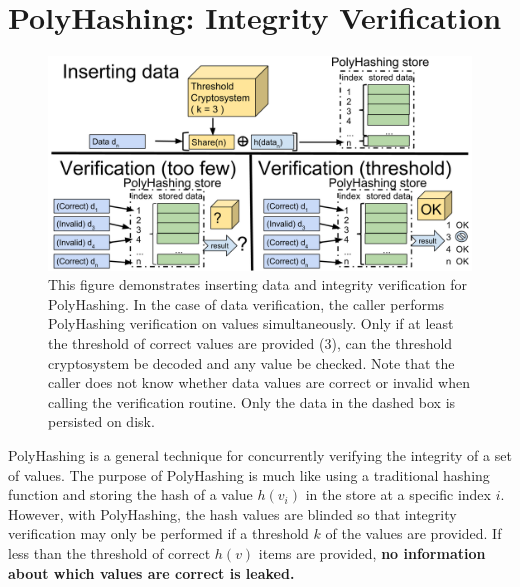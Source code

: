 \section{PolyHashing: Integrity Verification}
\label{sec-polyhashing}

\begin{figure}
\center
\hspace{-4mm}
\includegraphics[width=1.05\columnwidth]{figures/polyhashing.png}
\caption{This figure demonstrates inserting data and integrity verification 
for PolyHashing.   In the case of data verification, the caller performs 
PolyHashing verification on values simultaneously.  Only if at least the 
threshold of correct values are provided (3), can 
the threshold cryptosystem be decoded and any value be checked. Note that the
caller does not know whether data values are correct or invalid when calling
the verification routine.   Only the data in the dashed box is persisted
on disk.}
\label{fig-polyhashing}
\end{figure}




PolyHashing is a general technique for concurrently verifying the integrity of 
a set of values.%
The purpose of PolyHashing is 
much like using a traditional hashing function and storing 
the hash of a value $h(v_i)$ in the store at a specific index $i$.   However, 
with PolyHashing, the hash values are blinded so that
integrity verification may only be performed if a threshold $k$ of the values 
are provided.   If less than the threshold of correct $h(v)$ items 
are provided, {\bf no information about which values are correct is leaked.}   


